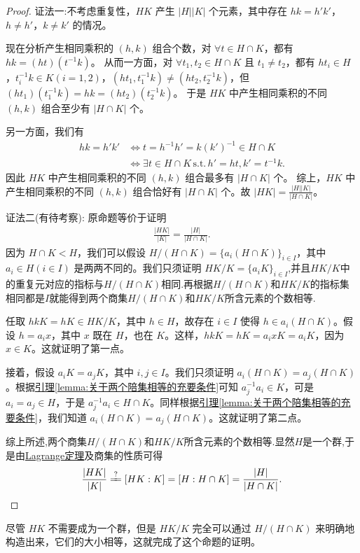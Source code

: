\documentclass[../../main.tex]{subfiles}
\begin{document}
\begin{proof}
{\color{blue}证法一:}不考虑重复性，\(HK\) 产生 \(|H||K|\) 个元素，其中存在 \(hk = h'k'\)，\(h \ne h'\)，\(k \ne k'\) 的情况。

现在分析产生相同乘积的 \((h, k)\) 组合个数，对 \(\forall t \in H \cap K\)，都有 \(hk = (ht)(t^{-1}k)\)。
从而一方面，对 \(\forall t_1, t_2 \in H \cap K\) 且 \(t_1 \ne t_2\)，都有 \(ht_i \in H\)，\(t_{i}^{-1}k \in K (i = 1, 2)\)，\((ht_1, t_{1}^{-1}k) \ne (ht_2, t_{2}^{-1}k)\)，但 \((ht_1)(t_{1}^{-1}k) = hk = (ht_2)(t_{2}^{-1}k)\)。
于是 \(HK\) 中产生相同乘积的不同 \((h, k)\) 组合至少有 \(|H \cap K|\) 个。

另一方面，我们有
\begin{align*}
hk = h'k' &\iff t = h^{-1}h' = k(k')^{-1} \in H \cap K \\
&\iff \exists t \in H \cap K \, \mathrm{s.t.} \, h' = ht, k' = t^{-1}k.
\end{align*}
因此 \(HK\) 中产生相同乘积的不同 \((h, k)\) 组合最多有 \(|H \cap K|\) 个。
综上，\(HK\) 中产生相同乘积的不同 \((h, k)\) 组合恰好有 \(|H \cap K|\) 个。故 \(|HK| = \frac{|H||K|}{|H \cap K|}\)。 


{\color{blue}证法二(有待考察):}
原命题等价于证明
\begin{align*}
\frac{|HK|}{|K|} = \frac{|H|}{|H \cap K|} .
\end{align*}
因为 \(H \cap K < H\)，我们可以假设 \(H/(H \cap K) = \{a_i(H \cap K)\}_{i \in I}\)，其中 \(a_i \in H (i \in I)\) 是两两不同的。我们只须证明 \(HK/K = \{a_iK\}_{i \in I}\),并且$HK/K$中的重复元对应的指标与$H/(H \cap K)$相同.再根据$H/(H \cap K)$和$HK/K$的指标集相同都是$I$就能得到两个商集$H/(H \cap K)$和$HK/K$所含元素的个数相等.

任取 \(hkK = hK \in HK/K\)，其中 \(h \in H\)，故存在 \(i \in I\) 使得 \(h \in a_i(H \cap K)\)。假设 \(h = a_ix\)，其中 \(x\) 既在 \(H\)，也在 \(K\)。这样，\(hkK = hK = a_ixK = a_iK\)，因为 \(x \in K\)。这就证明了第一点。

接着，假设 \(a_iK = a_jK\)，其中 \(i, j \in I\)。我们只须证明 \(a_i(H \cap K) = a_j(H \cap K)\)。根据\hyperref[lemma:关于两个陪集相等的充要条件]{引理\ref{lemma:关于两个陪集相等的充要条件}}可知 \(a_j^{-1}a_i \in K\)，可是 \(a_i = a_j \in H\)，于是 \(a_j^{-1}a_i \in H \cap K\)。同样根据\hyperref[lemma:关于两个陪集相等的充要条件]{引理\ref{lemma:关于两个陪集相等的充要条件}}，我们知道 \(a_i(H \cap K) = a_j(H \cap K)\)。这就证明了第二点。

综上所述,两个商集$H/(H \cap K)$和$HK/K$所含元素的个数相等.显然$H$是一个群,于是由\hyperref[theorem:Lagrange定理]{Lagrange定理}及商集的性质可得
\begin{align*}
\frac{|HK|}{|K|}\xlongequal{?}\left[ HK:K \right] =\left[ H:H\cap K \right] =\frac{|H|}{|H\cap K|}.
\end{align*}

\end{proof}
\begin{remark}
尽管 \(HK\) 不需要成为一个群，但是 \(HK/K\) 完全可以通过 \(H/(H \cap K)\) 来明确地构造出来，它们的大小相等，这就完成了这个命题的证明。 
\end{remark}
\end{document}
